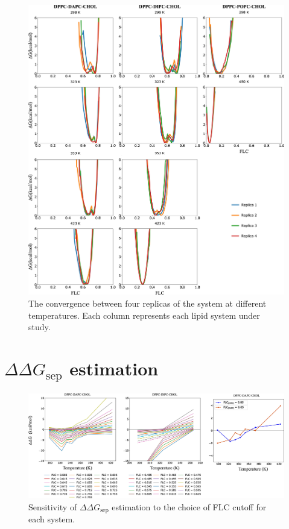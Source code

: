 \documentclass[10pt]{article}
\let\oldsection\section
\renewcommand{\section}{\clearpage\oldsection}
\begin{document}
\begin{figure}[H]
    \centering
    \includegraphics[width=6.5in]{Figures/Supplementary/ReplicaConvergence/placeholder.jpg}
    \caption{The convergence between four replicas of the system at different temperatures. Each column represents each lipid system under study.}
    \label{figs7:view}
\end{figure}

\section*{$\Delta\Delta G_\text{sep}$ estimation}

\begin{figure}[H]
    \centering
    \includegraphics[width=6.5in]{Figures/Supplementary/InterpretingDelDelG/placeholder.jpg}
    \caption{Sensitivity of $\Delta\Delta G_\text{sep}$ estimation to the choice of FLC cutoff for each system. }
    \label{figs8:view}
\end{figure}



\end{document}
